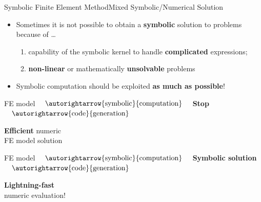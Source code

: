 \begin{frame}{Symbolic Finite Element Method}{Mixed Symbolic/Numerical Solution}
  \begin{itemize}
    \item Sometimes it is not possible to obtain a \textbf{symbolic} solution to problems because of \dots
    \begin{enumerate}
      \item capability of the symbolic kernel to handle \textbf{complicated} expressions;
      \item \textbf{non-linear} or mathematically \textbf{unsolvable} problems
    \end{enumerate}
    \item Symbolic computation should be exploited \textbf{as much as possible}!
  \end{itemize}
  \begin{bbox}
    \centering
    \acs{FE} model $\quad \autorightarrow{\text{symbolic}}{\text{computation}} \quad$ \hspace*{1.05cm}\textcolor{mycolor2}{\textbf{Stop}}\hspace*{1.05cm} $\quad \autorightarrow{\text{code}}{\text{generation}} \quad$ \begin{minipage}[c]{0.27\linewidth}\begin{center}{\textcolor{fg_sl_color}{\textbf{Efficient}} numeric \\ \acs{FE} model solution}\end{center}\end{minipage}
  \end{bbox}
  \begin{bbox}
    \centering
    \acs{FE} model $\quad \autorightarrow{\text{symbolic}}{\text{computation}} \quad$ \textcolor{mycolor5}{\textbf{Symbolic solution}} $\quad \autorightarrow {\text{code}}{\text{generation}} \quad$ \begin{minipage}[c]{0.27\linewidth}\begin{center}{\textcolor{fg_sl_color}{\textbf{Lightning-fast}} \\ numeric evaluation!}\end{center}\end{minipage}
  \end{bbox}
\end{frame}


